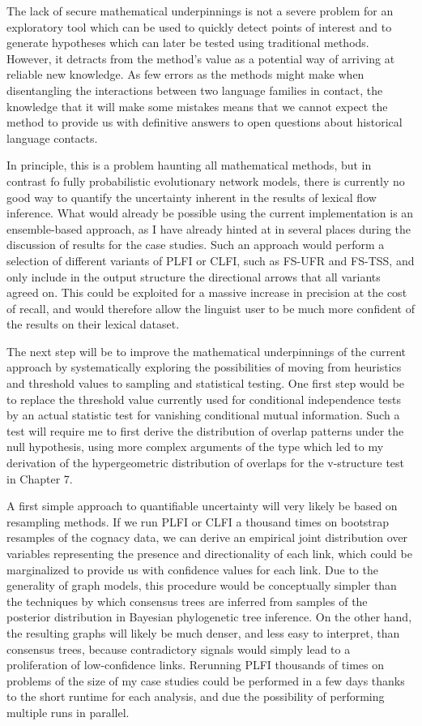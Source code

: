 The lack of secure mathematical underpinnings is not a severe problem for an exploratory tool which can be used to quickly detect points of interest and to generate hypotheses which can later be tested using traditional methods. However, it detracts from the method's value as a potential way of arriving at reliable new knowledge. As few errors as the methods might make when disentangling the interactions between two language families in contact, the knowledge that it will make some mistakes means that we cannot expect the method to provide us with definitive answers to open questions about historical language contacts. 

In principle, this is a problem haunting all mathematical methods, but in contrast fo fully probabilistic evolutionary network models, there is currently no good way to quantify the uncertainty inherent in the results of lexical flow inference. What would already be possible using the current implementation is an ensemble-based approach, as I have already hinted at in several places during the discussion of results for the case studies. Such an approach would perform a selection of different variants of PLFI or CLFI, such as FS-UFR and FS-TSS, and only include in the output structure the directional arrows that all variants agreed on. This could be exploited for a massive increase in precision at the cost of recall, and would therefore allow the linguist user to be much more confident of the results on their lexical dataset.

The next step will be to improve the mathematical underpinnings of the current approach by systematically exploring the possibilities of moving from heuristics and threshold values to sampling and statistical testing. One first step would be to replace the threshold value currently used for conditional independence tests by an actual statistic test for vanishing conditional mutual information. Such a test will require me to first derive the distribution of overlap patterns under the null hypothesis, using more complex arguments of the type which led to my derivation of the hypergeometric distribution of overlaps for the v-structure test in Chapter 7.

A first simple approach to quantifiable uncertainty will very likely be based on resampling methods. If we run PLFI or CLFI a thousand times on bootstrap resamples of the cognacy data, we can derive an empirical joint distribution over variables representing the presence and directionality of each link, which could be marginalized to provide us with confidence values for each link. Due to the generality of graph models, this procedure would be conceptually simpler than the techniques by which consensus trees are inferred from samples of the posterior distribution in Bayesian phylogenetic tree inference. On the other hand, the resulting graphs will likely be much denser, and less easy to interpret, than consensus trees, because contradictory signals would simply lead to a proliferation of low-confidence links. Rerunning PLFI thousands of times on problems of the size of my case studies could be performed in a few days thanks to the short runtime for each analysis, and due the possibility of performing multiple runs in parallel.

